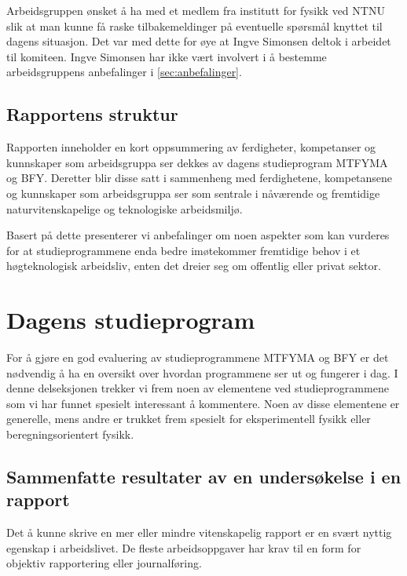 \documentclass{article}
\begin{document}
Arbeidsgruppen ønsket å ha med et medlem fra institutt for fysikk ved NTNU slik at man kunne få raske tilbakemeldinger på eventuelle spørsmål knyttet til dagens situasjon. Det var med dette for øye at Ingve Simonsen deltok i arbeidet til komiteen. Ingve Simonsen har ikke vært involvert i å bestemme arbeidsgruppens anbefalinger i \cref{sec:anbefalinger}.

\subsection{Rapportens struktur}
Rapporten inneholder en kort oppsummering av ferdigheter, kompetanser og kunnskaper som arbeidsgruppa ser dekkes av dagens studieprogram MTFYMA og BFY. Deretter blir disse satt i sammenheng med ferdighetene, kompetansene og kunnskaper som arbeidsgruppa ser som sentrale i nåværende og fremtidige naturvitenskapelige og teknologiske arbeidsmiljø.

Basert på dette presenterer vi anbefalinger om noen aspekter som kan vurderes for at studieprogrammene enda bedre imøtekommer fremtidige behov i et høgteknologisk arbeidsliv, enten det dreier seg om offentlig eller privat sektor.


\section{Dagens studieprogram}
\label{Sammenlikning}
For å gjøre en god evaluering av studieprogrammene MTFYMA og BFY er det nødvendig å ha en oversikt over hvordan programmene ser ut og fungerer i dag. I denne delseksjonen trekker vi frem noen av elementene ved studieprogrammene som vi har funnet spesielt interessant å kommentere. Noen av disse elementene er generelle, mens andre er trukket frem spesielt for eksperimentell fysikk eller beregningsorientert fysikk.

\subsection{Sammenfatte resultater av en undersøkelse i en rapport}
\label{Rapport}
Det å kunne skrive en mer eller mindre vitenskapelig rapport er en svært nyttig egenskap i arbeidslivet. De fleste arbeidsoppgaver har krav til en form for objektiv rapportering eller journalføring.
\end{document}
